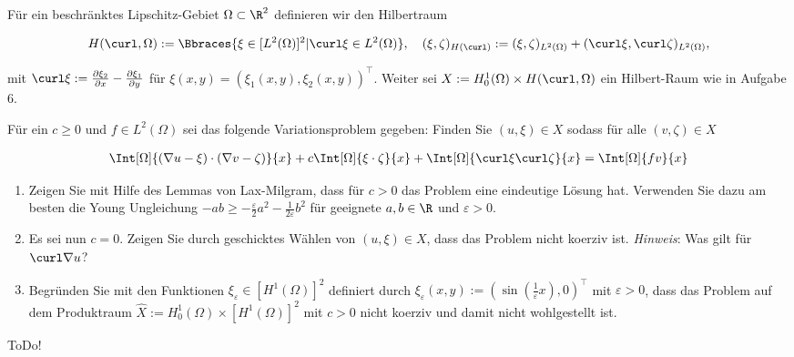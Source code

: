 
\begin{exercise}

Für ein beschränktes Lipschitz-Gebiet $\Omega \subset \R^2$ definieren wir den Hilbertraum

\begin{align*}
  H(\curl, \Omega)
  :=
  \Bbraces{\xi \in [L^2(\Omega)]^2 | \curl \xi \in L^2(\Omega)}, \quad
  (\xi, \zeta)_{H(\curl)}
  :=
  (\xi, \zeta)_{L^2(\Omega)} + (\curl \xi, \curl \zeta)_{L^2(\Omega)},
\end{align*}

mit $\curl \xi := \frac{\partial \xi_2}{\partial x} - \frac{\partial \xi_1}{\partial y}$ für $\xi(x,y) = (\xi_1(x,y),\xi_2(x,y))^\top$.
Weiter sei $X := H^1_0(\Omega) \times H(\curl, \Omega)$ ein Hilbert-Raum wie in Aufgabe $6$.

Für ein $c \geq 0$ und $f \in L^2(\Omega)$ sei das folgende Variationsproblem gegeben: Finden Sie $(u, \xi) \in X$ sodass für alle $(v, \zeta) \in X$

\begin{align}
  \Int[\Omega]{(\nabla u - \xi) \cdot (\nabla v - \zeta)}{x}
  +
  c \Int[\Omega]{\xi \cdot \zeta}{x}
  +
  \Int[\Omega]{\curl \xi \curl \zeta}{x}
  =
  \Int[\Omega]{f v}{x}
\end{align}

\begin{enumerate}[label = \textbf{\alph*)}]
  \item Zeigen Sie mit Hilfe des Lemmas von Lax-Milgram, dass für $c > 0$ das Problem eine eindeutige Lösung hat. Verwenden Sie dazu am besten die Young Ungleichung $-ab \geq - \frac{\varepsilon}{2} a^2 - \frac{1}{2\varepsilon}b^2$ für geeignete $a,b \in \R$ und $\varepsilon > 0$.

  \item Es sei nun $c = 0$. Zeigen Sie durch geschicktes Wählen von $(u, \xi) \in X$, dass das Problem nicht koerziv ist. \textit{Hinweis}: Was gilt für $\curl \nabla u$?

  \item Begründen Sie mit den Funktionen $\xi_\varepsilon \in [H^1(\Omega)]^2$ definiert durch $\xi_\varepsilon(x,y) := (\sin(\frac{1}{\varepsilon}x), 0)^\top$ mit $\varepsilon > 0$, dass das Problem auf dem Produktraum $\hat{X} := H^1_0(\Omega) \times [H^1(\Omega)]^2$ mit $c > 0$ nicht koerziv und damit nicht wohlgestellt ist.
\end{enumerate}
\end{exercise}


\begin{solution}

ToDo!

\end{solution}


